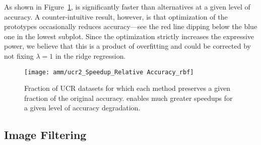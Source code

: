 As shown in Figure~\ref{fig:ucr}, \oursp is significantly faster than alternatives at a given level of accuracy.%
A counter-intuitive result, however, is that optimization of the prototypes occasionally reduces accuracy---see the red line dipping below the blue one in the lowest subplot. Since the optimization strictly increases the expressive power, we believe that this is a product of overfitting and could be corrected by not fixing $\lambda = 1$ in the ridge regression.

\begin{figure}[h]
\begin{center}
\texttt{[image: amm/ucr2\_Speedup\_Relative Accuracy\_rbf]}
\caption{Fraction of UCR datasets for which each method preserves a given fraction of the original accuracy.
\oursp enables much greater speedups for a given level of accuracy degradation.}
\label{fig:ucr}
\end{center}
\end{figure}

\vspace{-1mm}
\subsection{Image Filtering}
\vspace{-.5mm}

